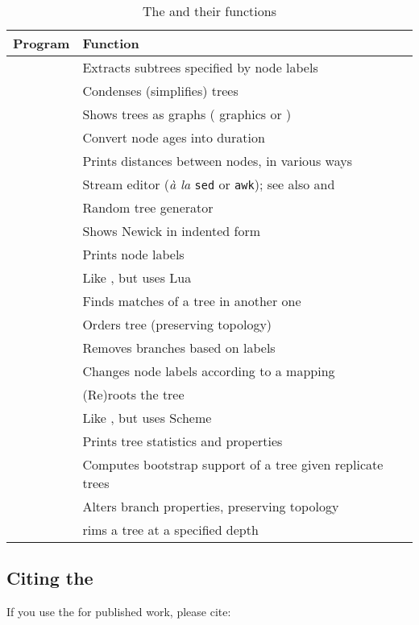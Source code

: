 \begin{table}[t]
\begin{tabular}{ll}
{\bf Program} & {\bf Function } \\
\hline
\clade		&	Extracts subtrees specified by node labels\\
\condense	&	Condenses (simplifies) trees \\
\display	&	Shows trees as graphs (\ascii{} graphics or \svg) \\
\duration	&	Convert node ages into duration \\
\distance	&	Prints distances between nodes, in various ways \\
\ed				&	Stream editor (\textit{\`{a} la} \texttt{sed} or \texttt{awk}); see also \luaed{} and \sched \\
\gen			&	Random tree generator \\
\nwindent	&	Shows Newick in indented form \\ 
		&	Prints node labels \\
\luaed				&	Like \ed, but uses Lua\\
\match		&	Finds matches of a tree in another one \\
\order		&	Orders tree (preserving topology) \\
\prune		&	Removes branches based on labels \\ 
\rename		&	Changes node labels according to a mapping \\
\reroot		&	(Re)roots the tree \\
\sched				&	Like \luaed, but uses Scheme\\
\stats		&	Prints tree statistics and properties \\
\support	&	Computes bootstrap support of a tree given replicate trees \\
\topology	&	Alters branch properties, preserving topology \\
\trim		&	rims a tree at a specified depth
\end{tabular}	
\caption{The \nutils{} and their functions}
\label{tbl_prog_list}
\end{table}

\subsection*{Citing the \nutils}

If you use the \nutils{} for published work, please cite:


